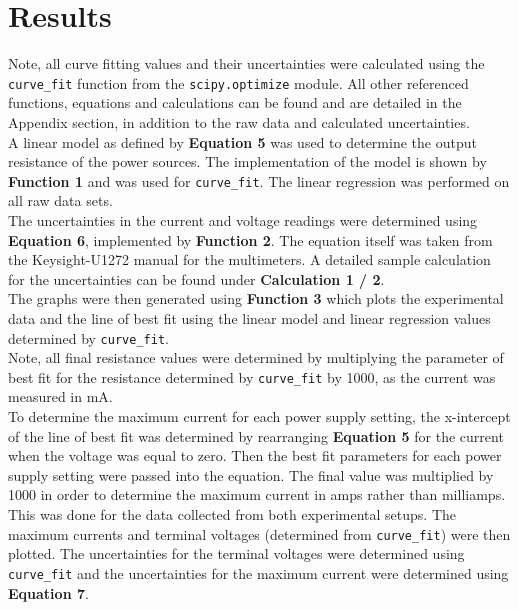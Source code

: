 \documentclass[
	letterpaper, %
	10pt, %
]{CSUniSchoolLabReport}
\begin{document}
\section{Results}
Note, all curve fitting values and their uncertainties were calculated using the \lstinline{curve_fit} function from the \lstinline{scipy.optimize} module. All other referenced functions, equations and calculations can be found and are detailed in the Appendix section, in addition to the raw data and calculated uncertainties.\\

A linear model as defined by \textbf{Equation 5} was used to determine the output resistance of the power sources. The implementation of the model is shown by \textbf{Function 1} and was used for \lstinline{curve_fit}. The linear regression was performed on all raw data sets.\\

The uncertainties in the current and voltage readings were determined using \textbf{Equation 6}, implemented by \textbf{Function 2}. The equation itself was taken from the Keysight-U1272 manual for the multimeters. A detailed sample calculation for the uncertainties can be found under \textbf{Calculation 1 / 2}.\\

The graphs were then generated using \textbf{Function 3} which plots the experimental data and the line of best fit using the linear model and linear regression values determined by \lstinline{curve_fit}.\\

Note, all final resistance values were determined by multiplying the parameter of best fit for the resistance  determined by \lstinline{curve_fit} by 1000, as the current was measured in mA.\\

To determine the maximum current for each power supply setting, the x-intercept of the line of best fit was determined by rearranging \textbf{Equation 5} for the current when the voltage was equal to zero. Then the best fit parameters for each power supply setting were passed into the equation. The final value was multiplied by 1000 in order to determine the maximum current in amps rather than milliamps. This was done for the data collected from both experimental setups. The maximum currents and terminal voltages (determined from \lstinline{curve_fit}) were then plotted. The uncertainties for the terminal voltages were determined using \lstinline{curve_fit} and the uncertainties for the maximum current were determined using \textbf{Equation 7}.

\newpage
\end{document}
